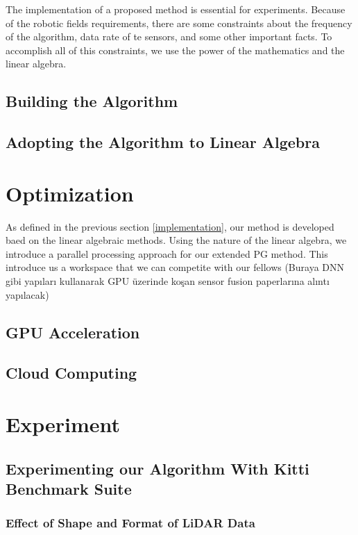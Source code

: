 \documentclass[conference]{IEEEtran}
\begin{document}
The implementation of a proposed method is essential for experiments. Because of the robotic fields requirements, there are some constraints about the frequency of the algorithm, data rate of te sensors, and some other important facts. To accomplish all of this constraints, we use the power of the mathematics and the linear algebra. 

\subsection{Building the Algorithm}

\subsection{Adopting the Algorithm to Linear Algebra}

\section{Optimization}

As defined in the previous section \ref{implementation}, our method is developed baed on the linear algebraic methods. Using the nature of the linear algebra, we introduce a parallel processing approach for our extended PG method. This introduce us a workspace that we can competite with our fellows (Buraya DNN gibi yapıları kullanarak GPU üzerinde koşan sensor fusion paperlarına alıntı yapılacak)

\subsection{GPU Acceleration}
\subsection{Cloud Computing}

\section{Experiment}

\subsection{Experimenting our Algorithm With Kitti Benchmark Suite}

\subsubsection{Effect of Shape and Format of LiDAR Data}
\end{document}
